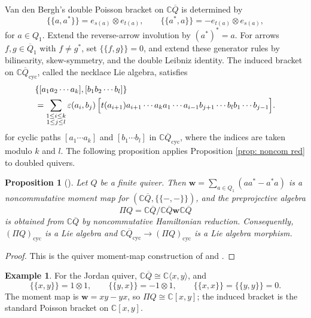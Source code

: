 \documentclass[11pt,reqno]{amsart}
\newtheorem{proposition}[theorem]{Proposition}
\theoremstyle{definition}
\newtheorem{example}[theorem]{Example}
\newcommand{\bbC}{\mathbb{C}}
\newcommand{\QQ}{\mathbb{C} \overline{Q}}
\newcommand{\ldb}{\mathopen{\{\!\!\{}}
\newcommand{\rdb}{\mathclose{\}\!\!\}}}
\newcommand{\bw}{\mathbf{w}}
\newcommand{\cyc}{\mathrm{cyc}}
\begin{document}
Van den Bergh's double Poisson bracket on \(\QQ\) is determined by
\begin{equation}\label{Vdbsdoublebracket}
\ldb a,a^*\rdb=e_{s(a)}\otimes e_{t(a)},
\qquad
\ldb a^*,a\rdb=-e_{t(a)}\otimes e_{s(a)},
\end{equation}
{for \(a\in Q_1\). { Extend the reverse-arrow involution by}
{  \((a^*)^*=a\)}.
{ For arrows} {  \(f,g\in\overline Q_1\)}  {with}
{  \(f\neq g^*\)}, { set} {  \(\ldb f,g\rdb=0\)}, and  {extend these
generator rules} by  {bilinearity, skew-symmetry, and the double Leibniz
identity}.} The induced bracket on \(\QQ_\cyc\), called the necklace Lie algebra, satisfies
\begin{equation}\label{necklace bracket}
\begin{aligned}
&\{[a_1a_2\cdots a_k],[b_1b_2\cdots b_l]\}\\
&=\sum_{\substack{1\leq i\leq k\\1\leq j\leq l}}
\varepsilon(a_i,b_j)\,
\Bigl[
t(a_{i+1})a_{i+1}\cdots a_ka_1\cdots a_{i-1}
b_{j+1}\cdots b_lb_1\cdots b_{j-1}
\Bigr].
\end{aligned}
\end{equation}
for cyclic paths \([a_1\cdots a_k]\) and \([b_1\cdots b_l]\) in \(\QQ_\cyc\), where the indices are taken modulo \(k\) and \(l\).
The following proposition applies Proposition 
\ref{prop: noncom red} to doubled quivers.

\begin{proposition}[{\cite{CBEG2007, Van2008Double}}]\label{prop: noncom Hamil on quiver}
Let \(Q\) be a finite quiver.
Then \(\bw=\sum_{a\in Q_1}(aa^*-a^*a)\) is a
noncommutative moment map for \((\QQ,\ldb-,-\rdb)\), 
and the preprojective algebra
\[
\Pi Q=\QQ/\QQ\bw\QQ
\]
is obtained from \(\QQ\) by noncommutative Hamiltonian reduction. Consequently, \((\Pi Q)_\cyc\) is a Lie algebra and \(\QQ_\cyc\to(\Pi Q)_\cyc\) is a Lie algebra morphism.
\end{proposition}

\begin{proof}
This is the quiver moment-map construction of
\cite[Theorem~6.3.1]{Van2008Double} and
\cite[Proposition~8.1.1(ii)--(iii), Section~8.2]{CBEG2007}.
\end{proof}

\begin{example}\label{eg: nc pois on Jordan}
For the Jordan quiver, \(\QQ\cong\bbC\langle x,y\rangle\), and
\[
\ldb x,y\rdb=1\otimes1,
\qquad
\ldb y,x\rdb=-1\otimes1,
\qquad
\ldb x,x\rdb=\ldb y,y\rdb=0.
\]
The moment map is \(\bw=xy-yx\), so \(\Pi Q\cong\bbC[x,y]\); the induced bracket is the standard Poisson bracket on \(\bbC[x,y]\).
\end{example}
\end{document}
